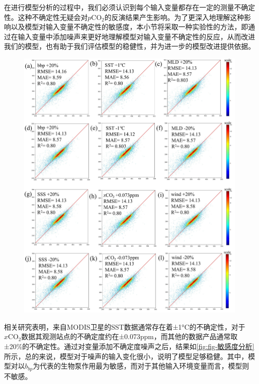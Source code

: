 在进行模型分析的过程中，我们必须认识到每个输入变量都存在一定的测量不确定性。这种不确定性无疑会对$p\mathrm{CO_2}$的反演结果产生影响。为了更深入地理解这种影响以及模型对输入变量不确定性的敏感度，本小节将采取一种实验性的方法，即通过在输入变量中添加噪声来更好地理解模型对输入变量不确定性的反应，从而改进我们的模型，也有助于我们评估模型的稳健性，并为进一步的模型改进提供依据。
\begin{figure}[htbp]
    \centering
    \includegraphics[width=\linewidth]{figure/第三章用图/图3-敏感度分析.jpg}
\end{figure}

相关研究表明，来自MODIS卫星的SST数据通常存在着±1°C的不确定性\cite{hu2009building}，对于$x\mathrm{CO_2}$数据其观测站点的不确定度约在±0.073ppm\cite{dlugokencky2021atmospheric}，而其他的数据产品通常取±20\%的不确定性。通过对变量添加不确定度噪声之后，结果如\autoref{fig:fig-敏感度分析}所示，总的来说，模型对于噪声的输入变化很小，说明了模型足够稳健。其中，模型对以$b_{bp}$为代表的生物泵作用最为敏感，而对于其他输入环境变量而言，模型则不敏感。

